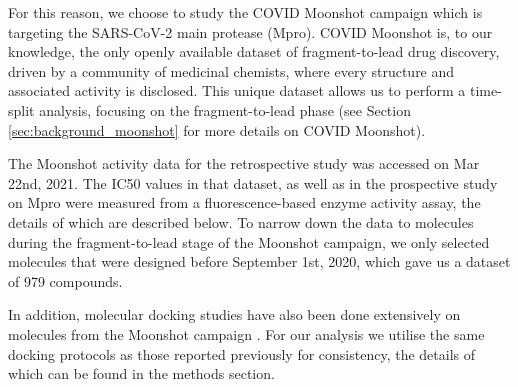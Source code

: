 For this reason, we choose to study the COVID Moonshot campaign \cite{Moonshot2022} which is targeting the SARS-CoV-2 main protease (Mpro). COVID Moonshot is, to our knowledge, the only openly available dataset of fragment-to-lead drug discovery, driven by a community of medicinal chemists, where every structure and associated activity is disclosed. This unique dataset allows us to perform a time-split analysis, focusing on the fragment-to-lead phase (see Section \ref{sec:background_moonshot} for more details on COVID Moonshot).

The Moonshot activity data for the retrospective study was accessed on Mar 22nd, 2021. The IC50 values in that dataset, as well as in the prospective study on Mpro were measured from a fluorescence-based enzyme activity assay, the details of which are described below. To narrow down the data to molecules during the fragment-to-lead stage of the Moonshot campaign, we only selected molecules that were designed before September 1st, 2020, which gave us a dataset of 979 compounds.

In addition, molecular docking studies have also been done extensively on molecules from the Moonshot campaign \cite{Morris2021Rank, Saar2021biorxiv}. For our analysis we utilise the same docking protocols as those reported previously for consistency, the details of which can be found in the methods section.

